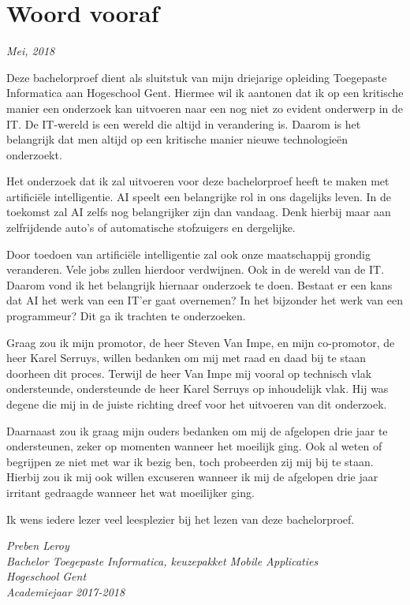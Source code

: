 
\chapter*{Woord vooraf}
\label{ch:voorwoord}

\begin{flushright}
	\textit{Mei, 2018}
\end{flushright}

Deze bachelorproef dient als sluitstuk van mijn driejarige opleiding Toegepaste Informatica aan Hogeschool Gent. Hiermee wil ik aantonen dat ik op een kritische manier een onderzoek kan uitvoeren naar een nog niet zo evident onderwerp in de IT. De IT-wereld is een wereld die altijd in verandering is. Daarom is het belangrijk dat men altijd op een kritische manier nieuwe technologieën onderzoekt.

Het onderzoek dat ik zal uitvoeren voor deze bachelorproef heeft te maken met artificiële intelligentie. AI speelt een belangrijke rol in ons dagelijks leven. In de toekomst zal AI zelfs nog belangrijker zijn dan vandaag. Denk hierbij maar aan zelfrijdende auto's of automatische stofzuigers en dergelijke. 

Door toedoen van artificiële intelligentie zal ook onze maatschappij grondig veranderen. Vele jobs zullen hierdoor verdwijnen. Ook in de wereld van de IT. Daarom vond ik het belangrijk hiernaar onderzoek te doen. Bestaat er een kans dat AI het werk van een IT'er gaat overnemen? In het bijzonder het werk van een programmeur? Dit ga ik trachten te onderzoeken. 

Graag zou ik mijn promotor, de heer Steven Van Impe, en mijn co-promotor, de heer Karel Serruys, willen bedanken om mij met raad en daad bij te staan doorheen dit proces. Terwijl de heer Van Impe mij vooral op technisch vlak ondersteunde, ondersteunde de heer Karel Serruys op inhoudelijk vlak. Hij was degene die mij in de juiste richting dreef voor het uitvoeren van dit onderzoek.

\break
Daarnaast zou ik graag mijn ouders bedanken om mij de afgelopen drie jaar te ondersteunen, zeker op momenten wanneer het moeilijk ging. Ook al weten of begrijpen ze niet met war ik bezig ben, toch probeerden zij mij bij te staan. Hierbij zou ik mij ook willen excuseren wanneer ik mij de afgelopen drie jaar irritant gedraagde wanneer het wat moeilijker ging. 

Ik wens iedere lezer veel leesplezier bij het lezen van deze bachelorproef.

\begin{flushright}
	\textit{Preben Leroy \\
		Bachelor Toegepaste Informatica, keuzepakket Mobile Applicaties \\
		Hogeschool Gent \\
		Academiejaar 2017-2018}
\end{flushright}